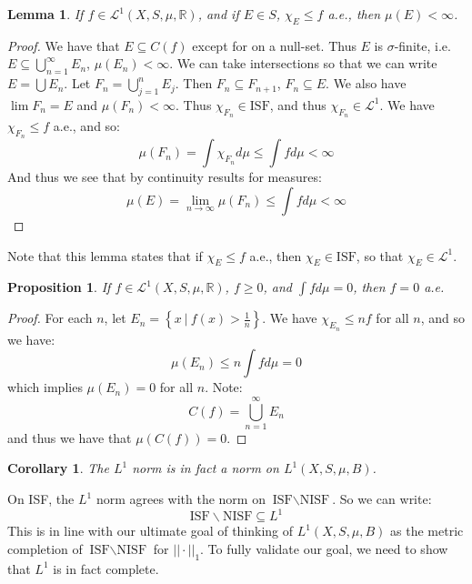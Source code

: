 \documentclass[a4paper,12pt]{report}
\newcommand{\ms}[1]{\mathscr{#1}}
\newcommand{\sse} {\subseteq}
\newtheorem{lemma}[theorem]{Lemma}
\newtheorem{corollary}[theorem]{Corollary}
\newtheorem{prop}[theorem]{Proposition}
\newenvironment{remark}[1][Remark.]{\begin{trivlist}
\item[\hskip \labelsep {\bfseries #1}]}{\end{trivlist}}
\begin{document}
	 \begin{lemma}
	 If $f \in \ms{L}^1(X, S, \mu, \mathbb{R})$, and if $E \in S$, $\chi_E \leq f$ a.e., then $\mu(E) < \infty$. 
	 \end{lemma}
	 \begin{proof}
	 We have that $E \sse C(f)$ except for on a null-set. Thus $E$ is $\sigma$-finite, i.e. $E \sse \bigcup_{n=1}^\infty E_n$, $\mu(E_n) < \infty$. We can take intersections so that we can write $E = \bigcup E_n$. Let $F_n = \bigcup_{j=1}^n E_j$. Then $F_n \sse F_{n+1}$, $F_n \sse E$. We also have $\lim F_n = E$ and $\mu(F_n) < \infty$. Thus $\chi_{F_n} \in \text{ISF}$, and thus $\chi_{F_n} \in \ms{L}^1$. We have $\chi_{F_n} \leq f$ a.e., and so:
	 \[ \mu(F_n) = \int \chi_{F_n} d\mu \leq \int f d\mu < \infty \]
	 And thus we see that by continuity results for measures:
	 \[ \mu(E) = \lim_{n \rightarrow \infty} \mu(F_n) \leq \int f d\mu < \infty \]
	 \end{proof}
	 
	 \noindent Note that this lemma states that if $\chi_E \leq f$ a.e., then $\chi_E \in \text{ISF}$, so that $\chi_E \in \ms{L}^1$. 
	 
	 \begin{prop}
	 If $f \in \ms{L}^1(X, S, \mu, \mathbb{R})$, $f \geq 0$, and $\int f d\mu = 0$, then $f = 0$ a.e. 
	 \end{prop}
	 \begin{proof}
	 For each $n$, let $E_n = \left\{ x ~|~ f(x) > \frac{1}{n} \right\}$. We have $\chi_{E_n} \leq nf$ for all $n$, and so we have:
	 \[ \mu(E_n) \leq n \int f d\mu = 0 \]
	 which implies $\mu(E_n) = 0$ for all $n$. Note:
	 \[ C(f) = \bigcup_{n=1}^\infty E_n \]
	 and thus we have that $\mu(C(f)) = 0$. 
	 \end{proof}
	 
	 \begin{corollary}
	 The $L^1$ norm is in fact a norm on $L^1(X, S, \mu, B)$. 
	 \end{corollary}
	 
	 \begin{remark}
	 On ISF, the $L^1$ norm agrees with the norm on $\text{ISF} \backslash \text{NISF}$. So we can write:
	 \[ \text{ISF} \backslash \text{NISF} \sse L^1 \]
	 This is in line with our ultimate goal of thinking of $L^1(X, S, \mu, B)$ as the metric completion of $\text{ISF} \backslash \text{NISF}$ for $||\cdot||_1$. To fully validate our goal, we need to show that $L^1$ is in fact complete.
	 \end{remark}
	 
\end{document}
